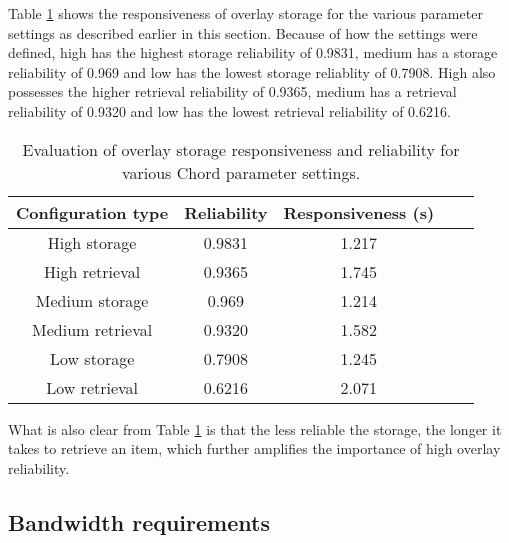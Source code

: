 Table \ref{tab_overlay_rel_resp_results} shows the responsiveness of overlay storage for the various parameter settings as described earlier in this section. Because of how the settings were defined, high has the highest storage reliability of 0.9831, medium has a storage reliability of 0.969 and low has the lowest storage reliablity of 0.7908. High also possesses the higher retrieval reliability of 0.9365, medium has a retrieval reliability of 0.9320 and low has the lowest retrieval reliability of 0.6216.
%
\begin{table}[htbp]
\centering
\begin{tabular}{|c|c|c|c|c|}
\hline
Configuration type & Reliability & Responsiveness (s)\\
\hline
High storage     &   0.9831      &   1.217  \\
High retrieval   &   0.9365      &   1.745  \\
Medium storage   &   0.969       &   1.214  \\
Medium retrieval &   0.9320      &   1.582  \\
Low storage      &   0.7908      &   1.245  \\
Low retrieval    &   0.6216      &   2.071  \\
\hline
\end{tabular}
\caption{Evaluation of overlay storage responsiveness and reliability for various Chord parameter settings.}
\label{tab_overlay_rel_resp_results}
\end{table}

What is also clear from Table \ref{tab_overlay_rel_resp_results} is that the less reliable the storage, the longer it takes to retrieve an item, which further amplifies the importance of high overlay reliability.

\subsection{Bandwidth requirements}
\label{bandwidth_requirements}

